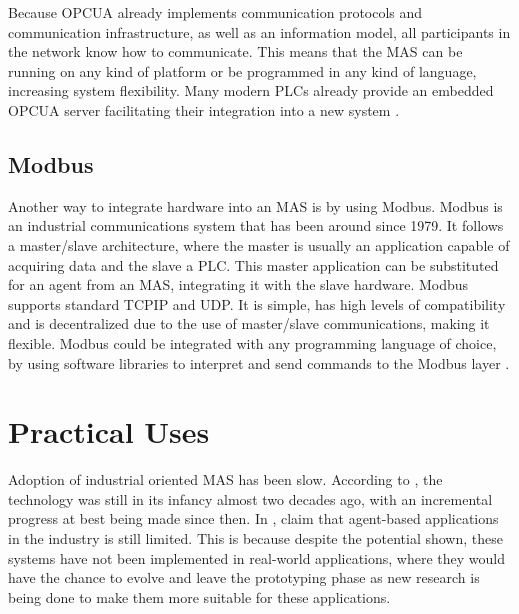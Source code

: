 Because \gls{OPCUA} already implements communication protocols and communication infrastructure, as well as an information model, all participants in the network know how to communicate. This means that the \gls{MAS} can be running on any kind of platform or be programmed in any kind of language, increasing system flexibility. Many modern \gls{PLC}s already provide an embedded \gls{OPCUA} server facilitating their integration into a new system \cite{Seitz2021}.

\subsection{Modbus}

Another way to integrate hardware into an \gls{MAS} is by using Modbus. Modbus is an industrial communications system that has been around since 1979. It follows a master/slave architecture, where the master is usually an application capable of acquiring data and the slave a \gls{PLC}. This master application can be substituted for an agent from an \gls{MAS}, integrating it with the slave hardware. Modbus supports standard \gls{TCPIP} and \gls{UDP}. It is simple, has high levels of compatibility and is decentralized due to the use of master/slave communications, making it flexible. Modbus could be integrated with any programming language of choice, by using software libraries to interpret and send commands to the Modbus layer \cite{10084891}.
\section{Practical Uses}
\label{sec:practical_uses}

Adoption of industrial oriented \gls{MAS} has been slow. According to \citeauthor{karnouskos02} \cite{karnouskos02}, the technology was still in its infancy almost two decades ago, with an incremental progress at best being made since then. In \cite{Karnouskos2019}, \citeauthor{Karnouskos2019} claim that agent-based applications in the industry is still limited. This is because despite the potential shown, these systems have not been implemented in real-world applications, where they would have the chance to evolve and leave the prototyping phase as new research is being done to make them more suitable for these applications.\\

